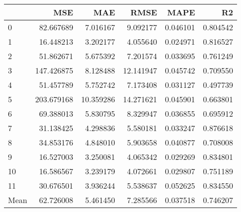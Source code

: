 \begin{tabular}{lrrrrr}
\toprule
 & MSE & MAE & RMSE & MAPE & R2 \\
\midrule
0 & 82.667689 & 7.016167 & 9.092177 & 0.046101 & 0.804542 \\
1 & 16.448213 & 3.202177 & 4.055640 & 0.024971 & 0.816527 \\
2 & 51.862671 & 5.675392 & 7.201574 & 0.033695 & 0.761249 \\
3 & 147.426875 & 8.128488 & 12.141947 & 0.045742 & 0.709550 \\
4 & 51.457789 & 5.752742 & 7.173408 & 0.031127 & 0.497739 \\
5 & 203.679168 & 10.359286 & 14.271621 & 0.045901 & 0.663801 \\
6 & 69.388013 & 5.830795 & 8.329947 & 0.036855 & 0.695912 \\
7 & 31.138425 & 4.298836 & 5.580181 & 0.033247 & 0.876618 \\
8 & 34.853176 & 4.848010 & 5.903658 & 0.040877 & 0.708008 \\
9 & 16.527003 & 3.250081 & 4.065342 & 0.029269 & 0.834801 \\
10 & 16.586567 & 3.239179 & 4.072661 & 0.029807 & 0.751189 \\
11 & 30.676501 & 3.936244 & 5.538637 & 0.052625 & 0.834550 \\
Mean & 62.726008 & 5.461450 & 7.285566 & 0.037518 & 0.746207 \\
\bottomrule
\end{tabular}
